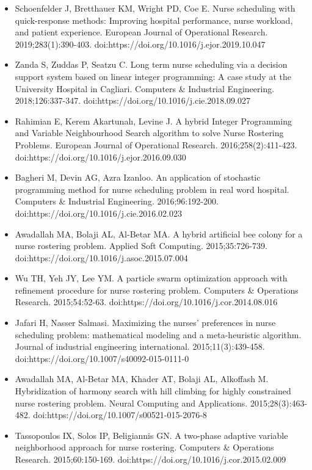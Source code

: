 \documentclass[10pt,a4paper,twocolumn]{article}
\begin{document}
\begin{itemize}[leftmargin=*]
\item [18] Schoenfelder J, Bretthauer KM, Wright PD, Coe E. Nurse scheduling with quick-response methods: Improving hospital performance, nurse workload, and patient experience. European Journal of Operational Research. 2019;283(1):390-403. doi:https://doi.org/10.1016/j.ejor.2019.10.047
\item [19] Zanda S, Zuddas P, Seatzu C. Long term nurse scheduling via a decision support system based on linear integer programming: A case study at the University Hospital in Cagliari. Computers \& Industrial Engineering. 2018;126:337-347. doi:https://doi.org/10.1016/j.cie.2018.09.027
\item [20] Rahimian E, Kerem Akartunalı, Levine J. A hybrid Integer Programming and Variable Neighbourhood Search algorithm to solve Nurse Rostering Problems. European Journal of Operational Research. 2016;258(2):411-423. doi:https://doi.org/10.1016/j.ejor.2016.09.030
\item [21] Bagheri M, Devin AG, Azra Izanloo. An application of stochastic programming method for nurse scheduling problem in real word hospital. Computers \& Industrial Engineering. 2016;96:192-200. doi:https://doi.org/10.1016/j.cie.2016.02.023
\item [22] Awadallah MA, Bolaji AL, Al-Betar MA. A hybrid artificial bee colony for a nurse rostering problem. Applied Soft Computing. 2015;35:726-739. doi:https://doi.org/10.1016/j.asoc.2015.07.004
\item [23] Wu TH, Yeh JY, Lee YM. A particle swarm optimization approach with refinement procedure for nurse rostering problem. Computers \& Operations Research. 2015;54:52-63. doi:https://doi.org/10.1016/j.cor.2014.08.016
\item [24] Jafari H, Nasser Salmasi. Maximizing the nurses' preferences in nurse scheduling problem: mathematical modeling and a meta-heuristic algorithm. Journal of industrial engineering international. 2015;11(3):439-458. doi:https://doi.org/10.1007/s40092-015-0111-0
\item [25] Awadallah MA, Al-Betar MA, Khader AT, Bolaji AL, Alkoffash M. Hybridization of harmony search with hill climbing for highly constrained nurse rostering problem. Neural Computing and Applications. 2015;28(3):463-482. doi:https://doi.org/10.1007/s00521-015-2076-8
\item [26] Tassopoulos IX, Solos IP, Beligiannis GN. A two-phase adaptive variable neighborhood approach for nurse rostering. Computers \& Operations Research. 2015;60:150-169. doi:https://doi.org/10.1016/j.cor.2015.02.009

\end{itemize}
\end{document}
